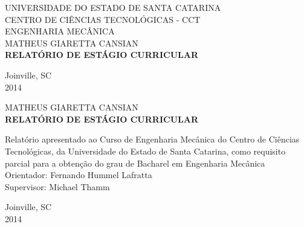 \documentclass[12pt]{article}
\begin{document}
	\begin{titlepage}
		\begin{center}
			{
				\fontsize{16pt}{\baselineskip}\fontfamily{\familydefault}\selectfont 
				UNIVERSIDADE DO ESTADO DE SANTA CATARINA \\
				CENTRO DE CIÊNCIAS TECNOLÓGICAS - CCT \\
				ENGENHARIA MECÂNICA
			}\\[6cm]
			
			{\fontsize{18pt}{\baselineskip}\fontfamily{\familydefault}\selectfont MATHEUS GIARETTA CANSIAN}\\[5.5cm]

			{\fontsize{18pt}{\baselineskip}\fontfamily{\familydefault}\selectfont \bf RELATÓRIO DE ESTÁGIO CURRICULAR}

			\vfill

			\fontsize{14pt}{\baselineskip} \fontfamily{\familydefault} \selectfont
			Joinville, SC\\[0.2cm]
			2014
		\end{center}
	\end{titlepage}

	\begin{titlepage}
		\begin{center}
			{\fontsize{16pt}{\baselineskip}\fontfamily{\familydefault}\selectfont MATHEUS GIARETTA CANSIAN}\\[6cm]
			{\fontsize{18pt}{\baselineskip}\fontfamily{\familydefault}\selectfont \bf RELATÓRIO DE ESTÁGIO CURRICULAR}\\[5.5cm]
		\end{center}
		
		{
			\fontsize{14pt}{\baselineskip} \fontfamily{\familydefault} \selectfont
			
			\hspace{.45\textwidth} \begin{minipage}{.5\textwidth}
				\noindent 
				Relatório apresentado ao Curso de Engenharia Mecânica do Centro de Ciências Tecnológicas, 
				da Universidade do Estado de Santa Catarina, 
				como requisito parcial para a obtenção do grau de Bacharel em Engenharia Mecânica\\[0.6cm]
				Orientador: Fernando Hummel Lafratta\\[0.1cm]
				Supervisor: Michael Thamm
			\end{minipage}
		}
		
		\vfill
		
		\begin{center}
		{
			\fontsize{14pt}{\baselineskip} \fontfamily{\familydefault} \selectfont
			Joinville, SC\\[0.2cm]
			2014
		}
		\end{center}
	\end{titlepage}
\end{document}
